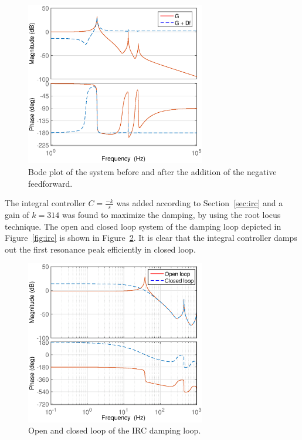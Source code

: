 \begin{figure}[h!]
  \centering
  \includegraphics[width=0.7\textwidth]{fig/matlab/bodeafterfeedf.eps}
  \caption{\label{fig:bodeafterfeedf} Bode plot of the system before and after the addition of the negative feedforward.}
\end{figure}

\FloatBarrier
The integral controller $C=\frac{-k}{s}$ was added according to Section~\ref{sec:irc} and a gain of $k=314$ was found to maximize the damping, by using the root locus technique.
The open and closed loop system of the \abbrIRC damping loop depicted in Figure~\ref{fig:irc} is shown in Figure~\ref{fig:bodedamped}. It is clear that the integral controller damps out the first resonance peak efficiently in closed loop.

\begin{figure}[h!]
  \centering
  \includegraphics[width=0.7\textwidth]{fig/matlab/bodedamped.eps}
  \caption{\label{fig:bodedamped} Open and closed loop of the IRC damping loop.}
\end{figure}

